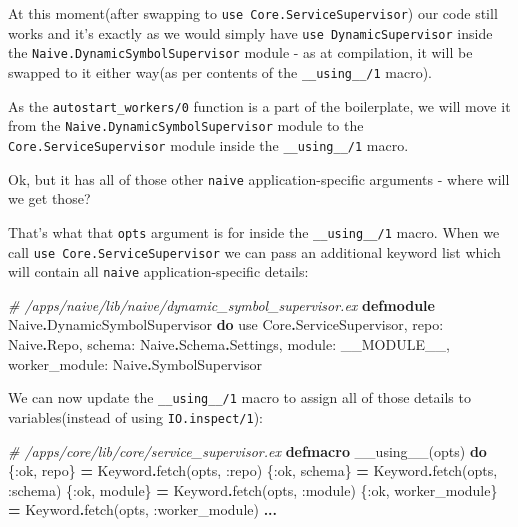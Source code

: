 \documentclass[
  oneside]{book}
\newenvironment{Shaded}{\begin{snugshade}}{\end{snugshade}}
\newcommand{\CommentTok}[1]{\textcolor[rgb]{0.56,0.35,0.01}{\textit{#1}}}
\newcommand{\ConstantTok}[1]{\textcolor[rgb]{0.00,0.00,0.00}{#1}}
\newcommand{\ImportTok}[1]{#1}
\newcommand{\KeywordTok}[1]{\textcolor[rgb]{0.13,0.29,0.53}{\textbf{#1}}}
\newcommand{\NormalTok}[1]{#1}
\newcommand{\OperatorTok}[1]{\textcolor[rgb]{0.81,0.36,0.00}{\textbf{#1}}}
\newcommand{\VariableTok}[1]{\textcolor[rgb]{0.00,0.00,0.00}{#1}}
\begin{document}
At this moment(after swapping to \texttt{use\ Core.ServiceSupervisor}) our code still works and it's exactly as we would simply have \texttt{use\ DynamicSupervisor} inside the \texttt{Naive.DynamicSymbolSupervisor} module - as at compilation, it will be swapped to it either way(as per contents of the \texttt{\_\_using\_\_/1} macro).

As the \texttt{autostart\_workers/0} function is a part of the boilerplate, we will move it from the \texttt{Naive.DynamicSymbolSupervisor} module to the \texttt{Core.ServiceSupervisor} module inside the \texttt{\_\_using\_\_/1} macro.

Ok, but it has all of those other \texttt{naive} application-specific arguments - where will we get those?

That's what that \texttt{opts} argument is for inside the \texttt{\_\_using\_\_/1} macro. When we call \texttt{use\ Core.ServiceSupervisor} we can pass an additional keyword list which will contain all \texttt{naive} application-specific details:

\begin{Shaded}
\begin{Highlighting}[]
\CommentTok{\# /apps/naive/lib/naive/dynamic\_symbol\_supervisor.ex}
\KeywordTok{defmodule} \ConstantTok{Naive}\OperatorTok{.}\ConstantTok{DynamicSymbolSupervisor} \KeywordTok{do}
  \ImportTok{use} \ConstantTok{Core}\OperatorTok{.}\ConstantTok{ServiceSupervisor}\NormalTok{,}
    \VariableTok{repo:} \ConstantTok{Naive}\OperatorTok{.}\ConstantTok{Repo}\NormalTok{,}
    \VariableTok{schema:} \ConstantTok{Naive}\OperatorTok{.}\ConstantTok{Schema}\OperatorTok{.}\ConstantTok{Settings}\NormalTok{,}
    \VariableTok{module:} \ConstantTok{\_\_MODULE\_\_}\NormalTok{,}
    \VariableTok{worker\_module:} \ConstantTok{Naive}\OperatorTok{.}\ConstantTok{SymbolSupervisor}
\end{Highlighting}
\end{Shaded}

We can now update the \texttt{\_\_using\_\_/1} macro to assign all of those details to variables(instead of using \texttt{IO.inspect/1}):

\begin{Shaded}
\begin{Highlighting}[]
  \CommentTok{\# /apps/core/lib/core/service\_supervisor.ex}
  \KeywordTok{defmacro}\NormalTok{ \_\_using\_\_(opts) }\KeywordTok{do}
\NormalTok{    \{}\VariableTok{:ok}\NormalTok{, repo\} }\OperatorTok{=} \ConstantTok{Keyword}\OperatorTok{.}\NormalTok{fetch(opts, }\VariableTok{:repo}\NormalTok{)}
\NormalTok{    \{}\VariableTok{:ok}\NormalTok{, schema\} }\OperatorTok{=} \ConstantTok{Keyword}\OperatorTok{.}\NormalTok{fetch(opts, }\VariableTok{:schema}\NormalTok{)}
\NormalTok{    \{}\VariableTok{:ok}\NormalTok{, module\} }\OperatorTok{=} \ConstantTok{Keyword}\OperatorTok{.}\NormalTok{fetch(opts, }\VariableTok{:module}\NormalTok{)}
\NormalTok{    \{}\VariableTok{:ok}\NormalTok{, worker\_module\} }\OperatorTok{=} \ConstantTok{Keyword}\OperatorTok{.}\NormalTok{fetch(opts, }\VariableTok{:worker\_module}\NormalTok{)}
    \OperatorTok{...}
\end{Highlighting}
\end{Shaded}
\end{document}
